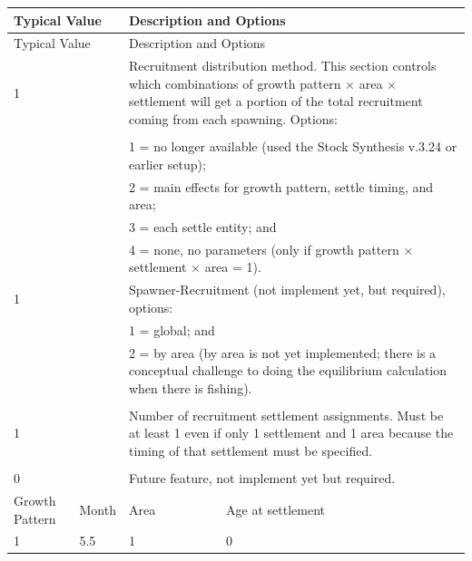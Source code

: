 \begin{center}
	\begin{longtable}{p{1.25cm} p{1.25cm} p{1cm} p{11.5cm}}
		\hline
		\multicolumn{2}{l}{Typical Value} & \multicolumn{2}{l}{Description and Options} \Tstrut\Bstrut\\
		\hline
		\endfirsthead
		
		\hline
		\multicolumn{2}{l}{Typical Value} & \multicolumn{2}{l}{Description and Options} \Tstrut\Bstrut\\
		\hline
		\endhead
		
		\hline
		\endfoot
		
		\endlastfoot
		
		1 & & \multicolumn{2}{l}{\parbox{12.5cm}{Recruitment distribution method. This section controls which combinations of growth pattern $\times$ area $\times$ settlement will get a portion of the total recruitment coming from each spawning. Options:}} \Tstrut\\
		& & \\
		& & \multicolumn{2}{l}{\parbox{12.5cm}{1 = no longer available (used the Stock Synthesis v.3.24 or earlier setup);}} \\
		& & \multicolumn{2}{l}{\parbox{12.5cm}{2 = main effects for growth pattern, settle timing, and area;}} \\
		& & \multicolumn{2}{l}{\parbox{12.5cm}{3 = each settle entity; and}} \\
		& & \multicolumn{2}{l}{\parbox{12.5cm}{4 = none, no parameters (only if growth pattern $\times$ settlement $\times$ area = 1).}} \Tstrut\Bstrut\\
		
		\hline
		1 & & \multicolumn{2}{l}{Spawner-Recruitment (not implement yet, but required), options:} \Tstrut\\
		& & \multicolumn{2}{l}{1 = global; and} \\
		& & \multicolumn{2}{l}{\parbox{12.5cm}{2 = by area (by area is not yet implemented; there is a conceptual challenge to doing the equilibrium calculation when there is fishing).}} \\
		& & \\
		
		\hline
		1 & & \multicolumn{2}{l}{\parbox{12.5cm}{Number of recruitment settlement assignments. Must be at least 1 even if only 1 settlement and 1 area because the timing of that settlement must be specified.}} \Tstrut\Bstrut\\ 
		& & \\
		
		\hline
		0 \Tstrut & & \multicolumn{2}{l}{Future feature, not implement yet but required.} \Bstrut\\
		
		\hline
		Growth Pattern & Month & Area & Age at settlement \Tstrut\\
		\hline
		1 & 5.5 & 1 & 0 \Bstrut\\
		\hline
	\end{longtable}
	\vspace*{-\baselineskip}
\end{center}


